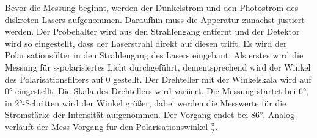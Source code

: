 Bevor die Messung beginnt, werden der Dunkelstrom und den Photostrom des diskreten Lasers aufgenommen.
Daraufhin muss die Apperatur zunächst justiert werden. Der Probehalter wird aus den Strahlengang entfernt und der Detektor wird 
so eingestellt, dass der Laserstrahl direkt auf diesen trifft. Es wird der Polarisationsfilter
in den Strahlengang des Lasers eingebaut. Als erstes wird die Messung für s-polarisiertes Licht durchgeführt, dementsprechend 
wird der Winkel des Polarisationsfilters auf 0 gestellt. Der Drehteller mit der Winkelskala wird auf $\ang{0}$ eingestellt.
Die Skala des Drehtellers wird variiert. Die Messung startet bei $\ang{6}$, in $\ang{2}$-Schritten wird der Winkel größer, dabei
werden die Messwerte für die Stromstärke der Intensität aufgenommen. Der Vorgang endet bei $\ang{86}$. Analog verläuft 
der Mess-Vorgang für den Polarisationswinkel $\frac{\pi}{2}$.
